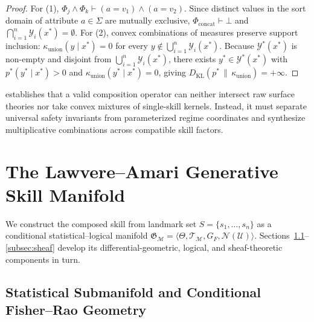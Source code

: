 \documentclass[11pt]{article}
\theoremstyle{definition}
\theoremstyle{plain}
\newcommand{\Ycal}{\mathcal{Y}}
\newcommand{\Ucal}{\mathcal{U}}
\newcommand{\Mcal}{\mathcal{M}}
\newcommand{\Tcal}{\mathcal{T}}
\newcommand{\Ncal}{\mathcal{N}}
\newcommand{\Gfrak}{\mathfrak{G}}
\newcommand{\KL}{D_{\mathrm{KL}}}
\begin{document}
\begin{proof}
For (1), $\Phi_j \land \Phi_k \vdash (a = v_1) \land (a = v_2)$. Since distinct values in the sort domain of attribute $a \in \Sigma$ are mutually exclusive, $\Phi_{\mathrm{concat}} \vdash \bot$ and $\bigcap_{i=1}^n \Ycal_i(x^*) = \emptyset$. For (2), convex combinations of measures preserve support inclusion: $\kappa_{\mathrm{union}}(y \mid x^*) = 0$ for every $y \notin \bigcup_{i=1}^n \Ycal_i(x^*)$. Because $\Ycal^*(x^*)$ is non-empty and disjoint from $\bigcup_{i=1}^n \Ycal_i(x^*)$, there exists $y^* \in \Ycal^*(x^*)$ with $p^*(y^* \mid x^*) > 0$ and $\kappa_{\mathrm{union}}(y^* \mid x^*) = 0$, giving $\KL(p^* \,\|\, \kappa_{\mathrm{union}}) = +\infty$.
\end{proof}

 establishes that a valid composition operator can neither intersect raw surface theories nor take convex mixtures of single-skill kernels. Instead, it must separate universal safety invariants from parameterized regime coordinates and synthesize multiplicative combinations across compatible skill factors.

\section{The Lawvere--Amari Generative Skill Manifold}
\label{sec:manifold}

We construct the composed skill from landmark set $S = \{s_1, \dots, s_n\}$ as a conditional statistical--logical manifold $\Gfrak_{\Mcal} = \langle \Theta, \Tcal_{\Mcal}, G_F, \Ncal(\Ucal) \rangle$. Sections~\ref{subsec:amari}--\ref{subsec:sheaf} develop its differential-geometric, logical, and sheaf-theoretic components in turn.

\subsection{Statistical Submanifold and Conditional Fisher--Rao Geometry}
\label{subsec:amari}
\end{document}
